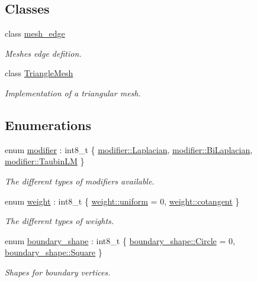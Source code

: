 \subsection*{Classes}
\begin{DoxyCompactItemize}
\item 
class \hyperlink{classgeoproc_1_1mesh__edge}{mesh\+\_\+edge}
\begin{DoxyCompactList}\small\item\em Meshe\textquotesingle{}s edge defition. \end{DoxyCompactList}\item 
class \hyperlink{classgeoproc_1_1TriangleMesh}{Triangle\+Mesh}
\begin{DoxyCompactList}\small\item\em Implementation of a triangular mesh. \end{DoxyCompactList}\end{DoxyCompactItemize}
\subsection*{Enumerations}
\begin{DoxyCompactItemize}
\item 
enum \hyperlink{namespacegeoproc_a396280579199558902594f4df72c01c7}{modifier} \+: int8\+\_\+t \{ \hyperlink{namespacegeoproc_a396280579199558902594f4df72c01c7a799723f39baf497704a3d39e7c03555f}{modifier\+::\+Laplacian}, 
\hyperlink{namespacegeoproc_a396280579199558902594f4df72c01c7a0890724bffb79f511bc768c0529dce3f}{modifier\+::\+Bi\+Laplacian}, 
\hyperlink{namespacegeoproc_a396280579199558902594f4df72c01c7ad69ec4945f39affa518f05fa077b00ae}{modifier\+::\+Taubin\+LM}
 \}\begin{DoxyCompactList}\small\item\em The different types of modifiers available. \end{DoxyCompactList}
\item 
enum \hyperlink{namespacegeoproc_a12e5a10581b53b9dd9a509127527f843}{weight} \+: int8\+\_\+t \{ \hyperlink{namespacegeoproc_a12e5a10581b53b9dd9a509127527f843aa489ffed938ef1b9e86889bc413501ee}{weight\+::uniform} = 0, 
\hyperlink{namespacegeoproc_a12e5a10581b53b9dd9a509127527f843a8e8ea879f40475ae2c70be8b296bf950}{weight\+::cotangent}
 \}\begin{DoxyCompactList}\small\item\em The different types of weights. \end{DoxyCompactList}
\item 
enum \hyperlink{namespacegeoproc_a494da744a805b80f842402f0a806ccfc}{boundary\+\_\+shape} \+: int8\+\_\+t \{ \hyperlink{namespacegeoproc_a494da744a805b80f842402f0a806ccfca30954d90085f6eaaf5817917fc5fecb3}{boundary\+\_\+shape\+::\+Circle} = 0, 
\hyperlink{namespacegeoproc_a494da744a805b80f842402f0a806ccfcaceb46ca115d05c51aa5a16a8867c3304}{boundary\+\_\+shape\+::\+Square}
 \}\begin{DoxyCompactList}\small\item\em Shapes for boundary vertices. \end{DoxyCompactList}
\end{DoxyCompactItemize}



